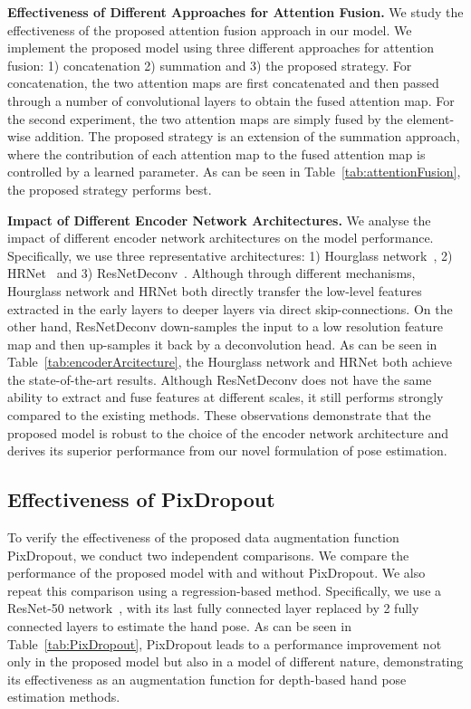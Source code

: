 \documentclass{article}
\begin{document}
\par
\textbf{Effectiveness of Different Approaches for Attention Fusion.} We study the effectiveness of the proposed attention fusion approach in our model. We implement the proposed model using three different approaches for attention fusion: 1) concatenation 2) summation and 3) the proposed strategy. For concatenation, the two attention maps are first concatenated and then passed through a number of convolutional layers to obtain the fused attention map. For the second experiment, the two attention maps are simply fused by the element-wise addition. The proposed strategy is an extension of the summation approach, where the contribution of each attention map to the fused attention map is controlled by a learned parameter. As can be seen in Table~\ref{tab:attentionFusion}, the proposed strategy performs best.\par
\textbf{Impact of Different Encoder Network Architectures.} We analyse the impact of different encoder network architectures on the model performance. Specifically, we use three representative architectures: 1) Hourglass network~\cite{newell2016stacked}, 2) HRNet~\cite{wang2020deep} and 3) ResNetDeconv~\cite{xiao2018simple}. Although through different mechanisms, Hourglass network and HRNet both directly transfer the low-level features extracted in the early layers to deeper layers via direct skip-connections. On the other hand, ResNetDeconv down-samples the input to a low resolution feature map and then up-samples it back by a deconvolution head. As can be seen in Table~\ref{tab:encoderArcitecture}, the Hourglass network and HRNet both achieve the state-of-the-art results. Although ResNetDeconv does not have the same ability to extract and fuse features at different scales, it still performs strongly compared to the existing methods. These observations demonstrate that the proposed model is robust to the choice of the encoder network architecture and derives its superior performance from our novel formulation of pose estimation.\subsection{Effectiveness of PixDropout}
To verify the effectiveness of the proposed data augmentation function PixDropout, we conduct two independent comparisons. We compare the performance of the proposed model with and without PixDropout. We also repeat this comparison using a regression-based method. Specifically, we use a ResNet-50 network~\cite{he2016identity}, with its last fully connected layer replaced by 2 fully connected layers to estimate the hand pose. As can be seen in Table~\ref{tab:PixDropout}, PixDropout leads to a performance improvement not only in the proposed model but also in a model of different nature, demonstrating its effectiveness as an augmentation function for depth-based hand pose estimation methods.
\end{document}
